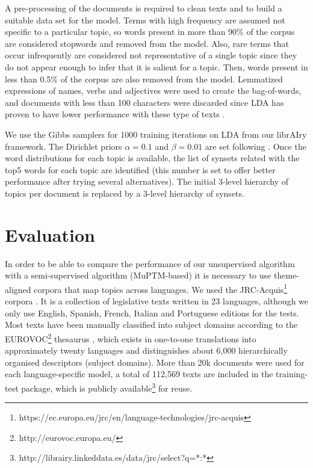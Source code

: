  A pre-processing of the documents is required to clean texts and to build a suitable data set for the model. Terms with high frequency are assumed not specific to a particular topic, so words present in more than 90\% of the corpus are considered stopwords and removed from the model. Also, rare terms that occur infrequently are considered not representative of a single topic since they do not appear enough to infer that it is salient for a topic. Then, words present in less than 0.5\% of the corpus are also removed from the model. Lemmatized expressions of names, verbs and adjectives were used to create the bag-of-words, and documents with less than 100 characters were discarded since LDA has proven to have lower performance with these type of texts \citep{Cheng2014a}. 

We use the Gibbs samplers for 1000 training iterations on LDA from our librAIry framework. The Dirichlet priors $\alpha=0.1$ and $\beta=0.01$ are set following \citep{Hu2014a}. Once the word distributions for each topic is available, the list of synsets related with the top5 words for each topic are identified (this number is set to offer better performance after trying several alternatives). The initial 3-level hierarchy of topics per document is replaced by a 3-level hierarchy of synsets. 

\section{Evaluation}
\label{sec:crosslingual-evaluation}

In order to be able to compare the performance of our unsupervised algorithm with a semi-supervised algorithm (MuPTM-based) it is necessary to use theme-aligned corpora that map topics across languages. We used the JRC-Acquis\footnote{https://ec.europa.eu/jrc/en/language-technologies/jrc-acquis} corpora \citep{Steinberger2006}. It is a collection of legislative texts written in 23 languages, although we only use English, Spanish,  French, Italian and Portuguese editions for the tests. Most texts have been manually classified into subject domains according to the EUROVOC\footnote{http://eurovoc.europa.eu/} thesaurus \citep{Eurovoc1995}, which exists in one-to-one translations into approximately twenty languages and distinguishes about 6,000 hierarchically organised descriptors (subject domains). More than 20k documents were used for each language-specific model, a total of 112,569 texts are included in the training-test package, which is publicly available\footnote{http://librairy.linkeddata.es/data/jrc/select?q=*:*} for reuse.

